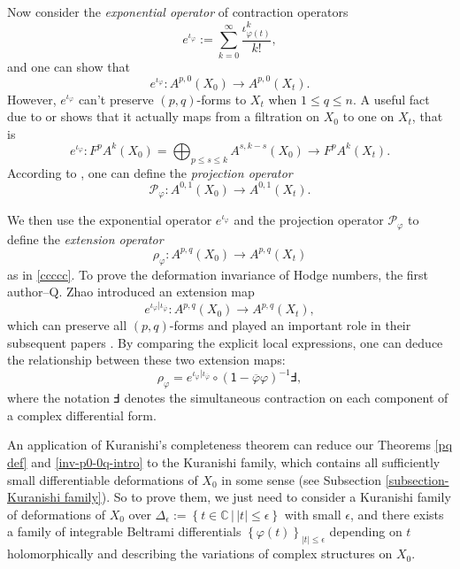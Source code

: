 \documentclass[12pt]{amsart}
\numberwithin{equation}{section}
\theoremstyle{definition}
\theoremstyle{definition}
\theoremstyle{definition}
\renewcommand{\1}{\mathsf{1}}
\renewcommand{\>}{\rightarrow}
\def\mb{\mathbb}
\def\v{\varphi}
\theoremstyle{plain} %
\theoremstyle{plain} %
\theoremstyle{plain} %
\begin{document}
Now  consider the \textit{exponential operator} of contraction operators
	$$e^{\iota_\v}:=\sum_{k=0}^{\infty}\frac{{\iota^k_{\v(t)}}}{k!},$$
	and one can show that
	$$
	e^{\iota_{\v}}: A^{p, 0}(X_0) \longrightarrow A^{p, 0}(X_{t}).
	$$However, $e^{\iota_{\v}}$ can't preserve $(p,q)$-forms  to $X_t$ when $1\leq q\leq n$.  A useful fact due to  \cite[Theorem 5.1]{FM09} or \cite[Section 3.1]{WZ20} shows that it actually maps from  a filtration on $X_0$ to one on $X_t$, that is
	$$e^{\iota_{\varphi}}: F^{p} A^{k}(X_0)=\mathop\bigoplus_{p \leq  s \leq k} A^{ s, k- s}(X_0) \longrightarrow F^{p} A^{k}(X_{t}).$$
	According to \cite{WZ20,Xi21b}, one can define the \textit{projection operator}
	$$	\mathcal P_{\v}:A^{0,1}(X_0)\longrightarrow A^{0,1}(X_t).$$
	
We then use  the exponential operator
	$e^{\iota_\v}$ and the projection operator $\mathcal P_\v$ to define the \textit{extension operator}
	\begin{equation}\label{filtration}\rho_\varphi: A^{p,q}(X_0)\longrightarrow A^{p,q}(X_t)
	\end{equation}
	as in \eqref{ccccc}.
	To prove the deformation invariance of Hodge numbers,  the first author--Q. Zhao \cite{ZR15,RZ18} introduced an extension map
	\begin{equation}\label{RAozhao}
		e^{\iota_{\varphi}|\iota_{\overline{\varphi}}}:
		A^{p,q}(X_0)\longrightarrow A^{p,q}(X_t),
	\end{equation} which can preserve all $(p,q)$-forms and played an important role in their subsequent papers \cite{RWZ19,RWZ21}. By comparing the explicit local expressions,  one can deduce the relationship between these  two extension maps:
	$$\rho_{\varphi}=e^{\iota_{\varphi}|\iota_{\overline{\varphi}}}\circ{\left(\1-\overline\varphi\varphi\right)}^{-1}\Finv,$$
	where the notation $\Finv$  denotes the
	simultaneous contraction on each component of a complex
	differential form.
	
	
	An application of Kuranishi's completeness theorem \cite{Ku64} can reduce our Theorems \ref{pq def} and \ref{inv-p0-0q-intro} to the Kuranishi family, which contains all sufficiently small differentiable deformations of $X_0$ in some sense (see Subsection \ref{subsection-Kuranishi family}). So to prove them, we just need to consider a Kuranishi family of deformations of $X_0$ over $\Delta_{\epsilon}:=\left\{t\in\mb C\,|\,|t|\leq\epsilon\right\}$ with small $\epsilon$, and there exists a family of integrable Beltrami differentials $\left\{\varphi(t)\right\}_{|t|\leq\epsilon} $ depending on $t$ holomorphically and describing the variations of complex structures on $X_0.$
	
\end{document}
